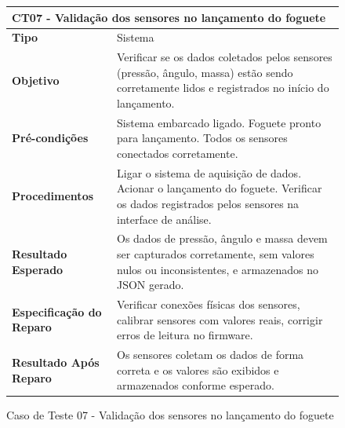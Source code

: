 \begin{figure}[H]
    \centering
\begin{longtable}{|p{}|p{}|}
\hline
\multicolumn{2}{|l|}{\textbf{CT07 - Validação dos sensores no lançamento do foguete}} \\
\hline
\textbf{Tipo} & Sistema \\
\hline
\textbf{Objetivo} & Verificar se os dados coletados pelos sensores (pressão, ângulo, massa) estão sendo corretamente lidos e registrados no início do lançamento. \\
\hline
\textbf{Pré-condições} & Sistema embarcado ligado.  Foguete pronto para lançamento.  Todos os sensores conectados corretamente. \\
\hline
\textbf{Procedimentos} & Ligar o sistema de aquisição de dados.  Acionar o lançamento do foguete.  Verificar os dados registrados pelos sensores na interface de análise. \\
\hline
\textbf{Resultado Esperado} & Os dados de pressão, ângulo e massa devem ser capturados corretamente, sem valores nulos ou inconsistentes, e armazenados no JSON gerado. \\
\hline
\textbf{Especificação do Reparo} & Verificar conexões físicas dos sensores, calibrar sensores com valores reais, corrigir erros de leitura no firmware. \\
\hline
\textbf{Resultado Após Reparo} & Os sensores coletam os dados de forma correta e os valores são exibidos e armazenados conforme esperado. \\
\hline
\end{longtable}
\caption{Caso de Teste 07 - Validação dos sensores no lançamento do foguete}
\label{fig_ct07_validacao_sensores_lancamento_foguete}
\end{figure}

